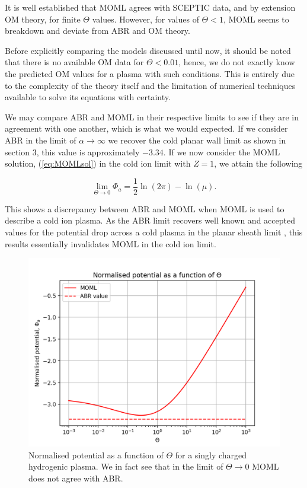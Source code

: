 \documentclass{article}
\begin{document}
\smallskip

It is well established that MOML agrees with SCEPTIC data, and by extension OM theory,
for finite $\Theta$ values. However, for values of $\Theta < 1$, MOML seems to breakdown and deviate 
from ABR and OM theory. 

\smallskip

Before explicitly comparing the models discussed until now, it should be noted that 
there is no available OM data for $\Theta < 0.01$, hence, we do not exactly know the predicted OM
values for a plasma with such conditions. This is entirely due to the complexity
of the theory itself and the limitation of numerical techniques available to solve its equations
with certainty. 

\smallskip

We may compare ABR and MOML in their respective limits to see if they are in 
agreement with one another, which is what we would expected.
If we consider ABR in the limit of $\alpha \to \infty$ we recover the cold planar
wall limit as shown in section 3, this value is approximately $-3.34$. If we now consider
the MOML solution, (\ref{eq:MOMLsol}) in the cold ion limit with $Z = 1$, we attain the following

\begin{equation}\label{eq:OMLLim}
\lim_{\Theta \to 0} \Phi_{a} = \frac{1}{2}\ln{\left(2 \pi \right)} - \ln{\left(\mu \right)}.
\end{equation}

\smallskip

This shows a discrepancy between ABR and MOML when MOML is used to
describe a cold ion plasma. As the ABR limit recovers well known and accepted values for
the potential drop across a cold plasma in the planar sheath limit \cite{Stangeby1986} \cite{Stangeby2000}, this results essentially
invalidates MOML in the cold ion limit.
    
\begin{figure}[H]
\centering
\includegraphics[width=\linewidth]{Output/MOMLvsABR.jpeg}
\caption{Normalised potential as a function of $\Theta$ for a singly charged hydrogenic plasma.
We in fact see that in the limit of $\Theta \to 0$ MOML does not agree with ABR.}
\label{MOMLvsABR} 
\end{figure}
\end{document}
